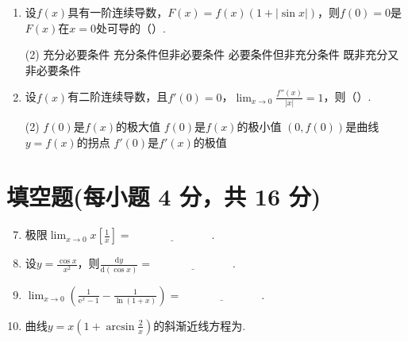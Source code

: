\documentclass[../main.tex]{subfiles}
\begin{document}
\begin{enumerate}
          \begin{tasks}[label=\textbf{\Alph*.}, label-width=1.5em, column-sep=1em](2)
              \task $-2f'(0)$
              \task $-f'(0)$
              \task $f'(0)$
              \task $0$
          \end{tasks}

    \item 设$f(x)$具有一阶连续导数，$F(x)=f(x)\left(1+|\sin x|\right)$，则$f(0)=0$是$F
              (x)$在$x=0$处可导的（\qquad）.

          \begin{tasks}[label=\textbf{\Alph*.}, label-width=1.5em, column-sep=1em](2)
              \task 充分必要条件
              \task 充分条件但非必要条件
              \task 必要条件但非充分条件
              \task 既非充分又非必要条件
          \end{tasks}

    \item 设$f(x)$有二阶连续导数，且$f'(0)=0$，$\lim_{x\to0}\frac{f''(x)}{|x|}=1$，则（\qquad）.

          \begin{tasks}[label=\textbf{\Alph*.}, label-width=1.5em, column-sep=1em](2)
              \task $f(0)$是$f(x)$的极大值
              \task $f(0)$是$f(x)$的极小值
              \task $\left(0,f(0)\right)$是曲线$y=f(x)$的拐点
              \task $f'(0)$是$f'(x)$的极值
          \end{tasks}
\end{enumerate}

\section{填空题(每小题 4 分，共 16 分)}
\begin{enumerate}
    \setcounter{enumi}{6}
    \item 极限$\lim_{x\to0}x\left[\frac{1}{x}\right]=\underline{\hspace{3cm}}$.

    \item 设$y=\frac{\cos x}{x^{2}}$，则$\frac{\mathrm{d}y}{\mathrm{d}(\cos
                  x)}=\underline{\hspace{3cm}}$.

    \item $\lim_{x\to0}\left(\frac{1}{\mathrm{e}^{x}-1}-\frac{1}{\ln(1+x)}\right
              )=\underline{\hspace{3cm}}$.

    \item 曲线$y=x\left(1+\arcsin\frac{2}{x}\right)$的斜渐近线方程为\underline{\hspace{3cm}}.
\end{enumerate}
\end{document}

